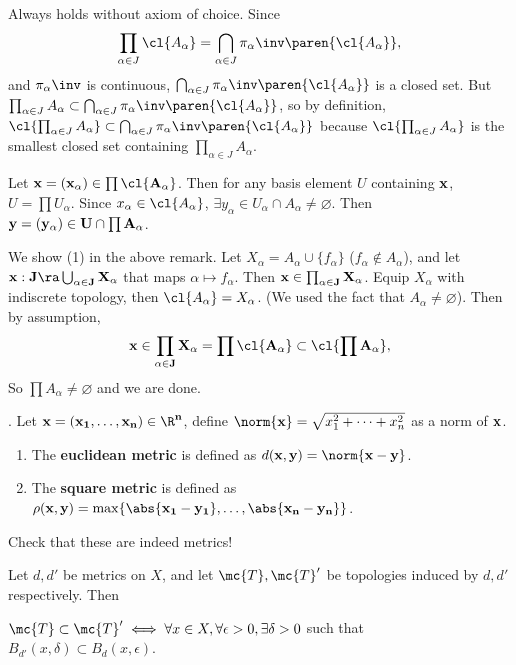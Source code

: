 \pf \note{\(\supset\)} Always holds without axiom of choice. Since
\[
    \prod_{\alpha \in J} \cl{A_\alpha} = \bigcap_{\alpha \in J} \pi_\alpha\inv\paren{\cl{A_\alpha}},
\]
and \(\pi_\alpha\inv\) is continuous, \(\bigcap_{\alpha \in J} \pi_\alpha\inv\paren{\cl{A_\alpha}}\) is a closed set. But \(\prod_{\alpha \in J} A_\alpha \subset \bigcap_{\alpha \in J} \pi_\alpha\inv\paren{\cl{A_\alpha}}\), so by definition, \(\cl{\prod_{\alpha \in J} A_\alpha} \subset \bigcap_{\alpha \in J} \pi_\alpha\inv\paren{\cl{A_\alpha}}\)
because \(\cl{\prod_{\alpha \in J} A_\alpha}\) is the smallest closed set containing \(\prod_{\alpha \in J} A_\alpha\).

 Let \(\bf{x} = (x_\alpha) \in \prod \cl{A_\alpha}\). Then for any basis element \(U\) containing \(\bf{x}\), \(U = \prod U_\alpha\). Since \(x_\alpha \in \cl{A_\alpha}\), \(\exists y_\alpha \in U_\alpha \cap A_\alpha \neq \varnothing\). Then \(\bf{y} = (y_\alpha) \in U \cap \prod A_\alpha\).

 We show (1) in the above remark. Let \(X_\alpha = A_\alpha \cup \{f_\alpha\}\) (\(f_\alpha \notin A_\alpha\)), and let \(\bf{x} : J \ra \bigcup_{\alpha \in J} X_\alpha\) that maps \(\alpha \mapsto f_\alpha\). Then \(\bf{x} \in \prod_{\alpha \in J} X_\alpha\). Equip \(X_\alpha\) with indiscrete topology, then \(\cl{A_\alpha} = X_\alpha\). (We used the fact that \(A_\alpha \neq \varnothing\)). Then by assumption,
\[
    \bf{x} \in \prod_{\alpha \in J} X_\alpha = \prod \cl{A_\alpha} \subset \cl{\prod A_\alpha},
\]
So \(\prod A_\alpha \neq \varnothing\) and we are done.

\vspace*{20px}

. Let \(\bf{x} = (x_1, \dots, x_n) \in \R^n\), define \(\norm{\bf{x}} = \sqrt{x_1^2 + \cdots + x_n^2}\) as a norm of \(\bf{x}\).
\begin{enumerate}
    \item The \textbf{euclidean metric} is defined as \(d(\bf{x}, \bf{y}) = \norm{\bf{x} - \bf{y}}\).
    \item The \textbf{square metric} is defined as \(\rho(\bf{x}, \bf{y}) = \max\{\abs{x_1 - y_1}, \dots, \abs{x_n - y_n}\}\).
\end{enumerate}

Check that these are indeed metrics!

 Let \(d, d'\) be metrics on \(X\), and let \(\mc{T}, \mc{T}'\) be topologies induced by \(d, d'\) respectively. Then
\begin{center}
    \(\mc{T} \subset \mc{T}' \iff \forall x \in X, \forall \epsilon > 0, \exists \delta > 0\) such that \(B_{d'}(x, \delta) \subset B_d(x, \epsilon)\).
\end{center}

